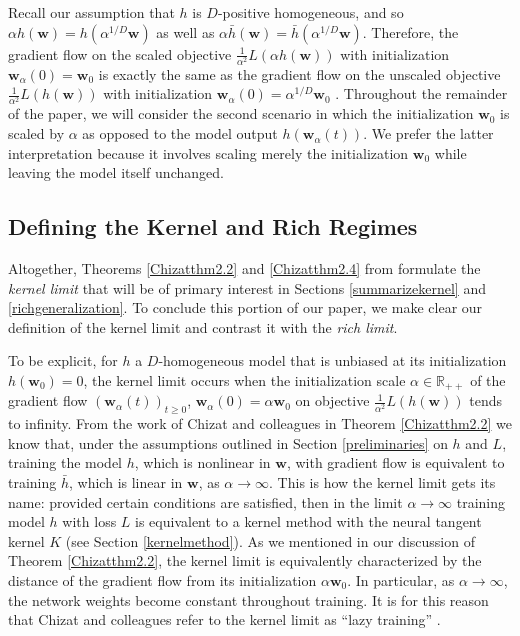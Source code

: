 \documentclass{article}
\begin{document}
Recall our assumption that $h$ is $D$-positive homogeneous, and so $\alpha h(\boldsymbol{w}) = h(\alpha^{1/D}\boldsymbol{w})$ as well as $\alpha \bar{h}(\boldsymbol{w}) = \bar{h}(\alpha^{1/D}\boldsymbol{w})$.
Therefore, the gradient flow on the scaled objective $\frac{1}{\alpha^2}L(\alpha h(\boldsymbol{w}))$ with initialization $\boldsymbol{w}_{\alpha}(0) = \boldsymbol{w}_0$ is exactly the same as the gradient flow on the unscaled objective $\frac{1}{\alpha^2}L(h(\boldsymbol{w}))$ with initialization $\boldsymbol{w}_{\alpha}(0) = \alpha^{1/D}\boldsymbol{w}_0$ \cite{woodworth2020kernel}. Throughout the remainder of the paper, we will consider the second scenario in which the initialization $\boldsymbol{w}_0$ is scaled by $\alpha$ as opposed to the model output $h(\boldsymbol{w}_{\alpha}(t))$. We prefer the latter interpretation because it involves scaling merely the initialization $\boldsymbol{w}_0$ while leaving the model itself unchanged.

\subsection{Defining the Kernel and Rich Regimes}\label{defkernelrich}

Altogether, Theorems \ref{Chizatthm2.2} and \ref{Chizatthm2.4} from \cite{chizat2018lazy} formulate the \textit{kernel limit} that will be of primary interest in Sections \ref{summarizekernel} and \ref{richgeneralization}. To conclude this portion of our paper, we make clear our definition of the kernel limit and contrast it with the \textit{rich limit}. 

To be explicit, for $h$ a $D$-homogeneous model that is unbiased at its initialization $h(\boldsymbol{w}_0) = 0$, the kernel limit occurs when the initialization scale $\alpha \in \mathbb{R}_{++}$ of the gradient flow $(\boldsymbol{w}_{\alpha}(t))_{t \geq 0}$, $\boldsymbol{w}_{\alpha}(0) = \alpha \boldsymbol{w}_0$ on objective $\frac{1}{\alpha^2}L(h(\boldsymbol{w}))$ tends to infinity. From the work of Chizat and colleagues in Theorem \ref{Chizatthm2.2} we know that, under the assumptions outlined in Section \ref{preliminaries} on $h$ and $L$, training the  model $h$, which is nonlinear in $\boldsymbol{w}$, with gradient flow is equivalent to training $\bar{h}$, which is linear in $\boldsymbol{w}$, as $\alpha \rightarrow \infty$. This is how the kernel limit gets its name: provided certain conditions are satisfied, then in the limit $\alpha \rightarrow \infty$ training model $h$ with loss $L$ is equivalent to a kernel method with the neural tangent kernel $K$ (see Section \ref{kernelmethod}). As we mentioned in our discussion of Theorem \ref{Chizatthm2.2}, the kernel limit is equivalently characterized by the distance of the gradient flow from its initialization $\alpha \boldsymbol{w}_0$. In particular, as $\alpha \rightarrow \infty$, the network weights become constant throughout training. It is for this reason that Chizat and colleagues refer to the kernel limit as \enquote{lazy training} \cite{chizat2018lazy}. 
\end{document}
